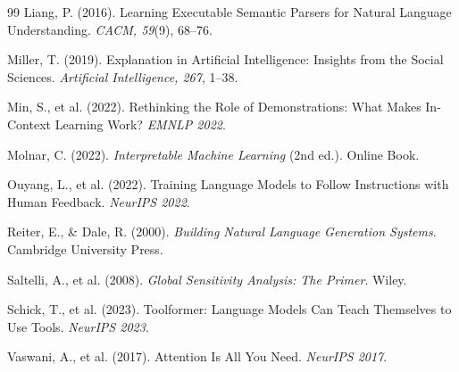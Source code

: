\documentclass[12pt,a4paper]{article}
\begin{document}
\begin{thebibliography}{99}
Liang, P. (2016). Learning Executable Semantic Parsers for Natural Language Understanding. \textit{CACM, 59}(9), 68--76.

Miller, T. (2019). Explanation in Artificial Intelligence: Insights from the Social Sciences. \textit{Artificial Intelligence, 267}, 1--38.

Min, S., et al. (2022). Rethinking the Role of Demonstrations: What Makes In-Context Learning Work? \textit{EMNLP 2022}.

Molnar, C. (2022). \textit{Interpretable Machine Learning} (2nd ed.). Online Book.

Ouyang, L., et al. (2022). Training Language Models to Follow Instructions with Human Feedback. \textit{NeurIPS 2022}.

Reiter, E., \& Dale, R. (2000). \textit{Building Natural Language Generation Systems}. Cambridge University Press.

Saltelli, A., et al. (2008). \textit{Global Sensitivity Analysis: The Primer}. Wiley.

Schick, T., et al. (2023). Toolformer: Language Models Can Teach Themselves to Use Tools. \textit{NeurIPS 2023}.

Vaswani, A., et al. (2017). Attention Is All You Need. \textit{NeurIPS 2017}.

\end{thebibliography}
\end{document}
